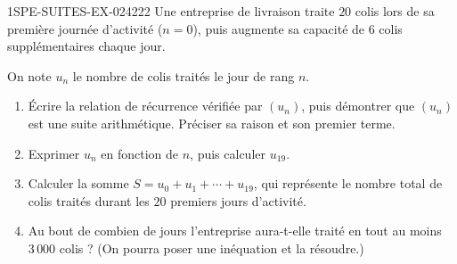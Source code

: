 \begin{exercice}{1SPE-SUITES-EX-024}{2}{22}
Une entreprise de livraison traite $20$ colis lors de sa première journée d'activité ($n = 0$), puis augmente sa capacité de $6$ colis supplémentaires chaque jour.

On note $u_n$ le nombre de colis traités le jour de rang $n$.

\begin{enumerate}
  \item Écrire la relation de récurrence vérifiée par $(u_n)$, puis démontrer que $(u_n)$ est une suite arithmétique. Préciser sa raison et son premier terme.

  \item Exprimer $u_n$ en fonction de $n$, puis calculer $u_{19}$.

  \item Calculer la somme $S = u_0 + u_1 + \cdots + u_{19}$, qui représente le nombre total de colis traités durant les $20$ premiers jours d'activité.

  \item Au bout de combien de jours l'entreprise aura-t-elle traité en tout au moins $3\,000$ colis ? (On pourra poser une inéquation et la résoudre.)
\end{enumerate}
\end{exercice}

